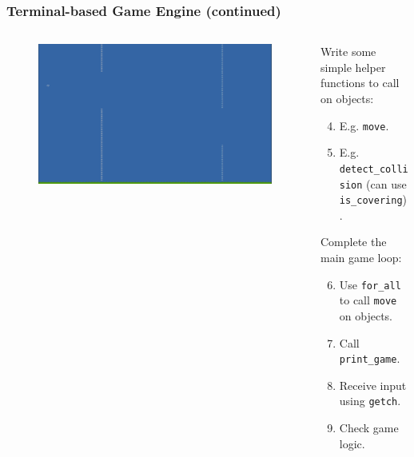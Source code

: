 \documentclass{beamer}
\begin{document}
\begin{frame}
	\frametitle{Terminal-based Game Engine (continued)}
	\begin{columns}
		\begin{column}{0.55\textwidth}
			\begin{figure}
				\includegraphics[width=\columnwidth]{Presentation/flappy.png}
			\end{figure}
		\end{column}
		\begin{column}{0.45\textwidth}
			Write some simple helper functions to call on objects:
			\begin{enumerate}
				\setcounter{enumi}{3}
				\item E.g. \texttt{move}.
				\item E.g. \texttt{detect\_collision} (can use \texttt{is\_covering}).
			\end{enumerate}
			Complete the main game loop:
			\begin{enumerate}
				\setcounter{enumi}{5}
				\item Use \texttt{for\_all} to call \texttt{move} on objects.
				\item Call \texttt{print\_game}.
				\item Receive input using \texttt{getch}.
				\item Check game logic.
			\end{enumerate}
		\end{column}
	\end{columns}
\end{frame}
\end{document}
